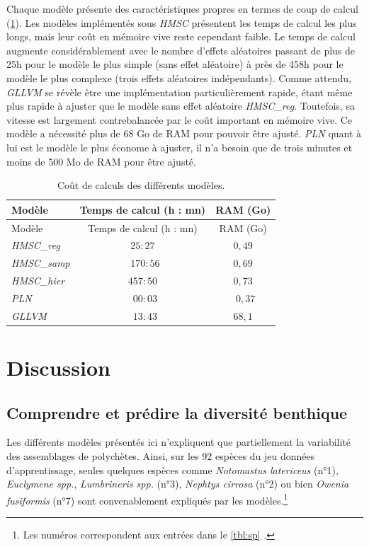 \documentclass[12pt,]{article}
\begin{document}
Chaque modèle présente des caractéristiques propres en termes de coup de
calcul (\cref{tbl:coutcalc}). Les modèles implémentés sous \emph{HMSC}
présentent les temps de calcul les plus longs, mais leur coût en mémoire
vive reste cependant faible. Le temps de calcul augmente
considérablement avec le nombre d'effets aléatoires passant de plus de
25h pour le modèle le plus simple (sans effet aléatoire) à près de 458h
pour le modèle le plus complexe (trois effets aléatoires indépendants).
Comme attendu, \emph{GLLVM} se révèle être une implémentation
particulièrement rapide, étant même plus rapide à ajuster que le modèle
sans effet aléatoire \emph{HMSC\_reg}. Toutefois, sa vitesse est
largement contrebalancée par le coût important en mémoire vive. Ce
modèle a nécessité plus de 68 Go de RAM pour pouvoir être ajusté.
\emph{PLN} quant à lui est le modèle le plus économe à ajuster, il n'a
besoin que de trois minutes et moins de 500 Mo de RAM pour être ajusté.

{\small
\begin{longtable}[]{@{}lcc@{}}
\caption{Coût de calculs des différents modèles.
\label{tbl:coutcalc}}\tabularnewline
\toprule
Modèle & Temps de calcul (h : mn) & RAM (Go)\tabularnewline
\midrule
\endfirsthead
\toprule
Modèle & Temps de calcul (h : mn) & RAM (Go)\tabularnewline
\midrule
\endhead
\emph{HMSC\_reg} & \(25:27\) & \(0,49\)\tabularnewline
\emph{HMSC\_samp} & ~\(170:56\) & \(0,69\)\tabularnewline
\emph{HMSC\_hier} & \(457:50\) & \(0,73\)\tabularnewline
\emph{PLN} & ~\(00:03\) & ~\(0,37\)\tabularnewline
\emph{GLLVM} & ~\(13:43\) & \(68,1\)\tabularnewline
\bottomrule
\end{longtable}}\FloatBarrier


\hypertarget{discussion}{%
\section{Discussion}\label{discussion}}

\hypertarget{comprendre-et-pruxe9dire-la-diversituxe9-benthique}{%
\subsection{Comprendre et prédire la diversité
benthique}\label{comprendre-et-pruxe9dire-la-diversituxe9-benthique}}

Les différents modèles présentés ici n'expliquent que partiellement la
variabilité des assemblages de polychètes. Ainsi, sur les 92 espèces du
jeu données d'apprentissage, seules quelques espèces comme
\emph{Notomastus latericeus} (n°1), \emph{Euclymene spp.},
\emph{Lumbrineris spp.} (n°3), \emph{Nephtys cirrosa} (n°2) ou bien
\emph{Owenia fusiformis} (n°7) sont convenablement expliqués par les
modèles.\footnote{Les numéros correspondent aux entrées dans le
  \cref{tbl:sp} .}
\end{document}
